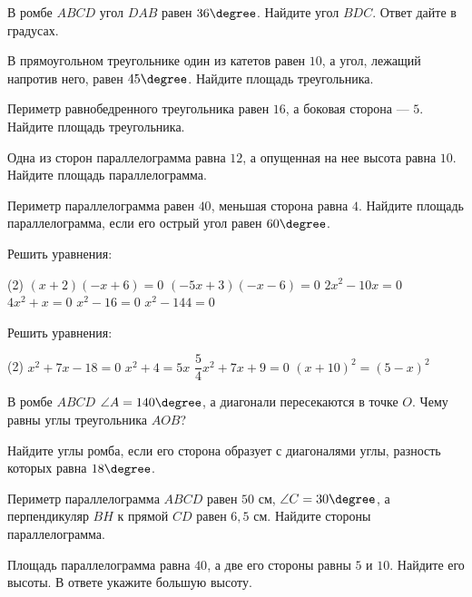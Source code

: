 \begin{homework}[number=2]
	\begin{listofex}
		\item В ромбе \( ABCD \)  угол \( DAB \)  равен \( 36\degree \). Найдите угол \( BDC \). Ответ дайте в градусах.
		\item В прямоугольном треугольнике один из катетов равен \( 10 \), а угол, лежащий напротив него, равен \( 45\degree \). Найдите площадь треугольника.
		\item Периметр равнобедренного треугольника равен \( 16 \), а боковая сторона --- \( 5 \). Найдите площадь треугольника.
		\item Одна из сторон параллелограмма равна \( 12 \), а опущенная на нее высота равна \( 10 \). Найдите площадь параллелограмма.
		\item Периметр параллелограмма равен \( 40 \), меньшая сторона равна \( 4 \). Найдите площадь параллелограмма, если его острый угол равен \( 60\degree \).
	\end{listofex}
\end{homework}

\begin{class}[number=5]
	\begin{listofex}
		\item Решить уравнения:
		\begin{tasks}(2)
			\task \( (x+2)(-x+6)=0 \)
			\task \( (-5x+3)(-x-6)=0 \)
			\task \( 2x^2-10x=0 \)
			\task \( 4x^2+x=0 \)
			\task \( x^2-16=0 \)
			\task \( x^2-144=0 \)
		\end{tasks}
		\item Решить уравнения:
		\begin{tasks}(2)
			\task \( x^2+7x-18=0 \)
			\task \( x^2+4=5x \)
			\task \( \dfrac{5}{4}x^2+7x+9=0 \)
			\task \( (x+10)^2=(5-x)^2 \)
		\end{tasks}
	
		\item В ромбе \( ABCD \) \( \angle A=140\degree \), а диагонали пересекаются в точке \( O \). Чему равны углы треугольника \( AOB \)?
		\item Найдите углы ромба, если его сторона образует с диагоналями углы, разность которых равна \( 18\degree \).
		\item Периметр параллелограмма \( ABCD \) равен \( 50 \) см, \( \angle C = 30\degree \), а перпендикуляр \( BH \) к прямой \( CD \) равен \( 6,5 \) см. Найдите стороны параллелограмма.
		\item Площадь параллелограмма равна \( 40 \), а две его стороны равны \( 5 \) и \( 10 \). Найдите его высоты. В ответе укажите большую высоту.
	\end{listofex}
\end{class}

